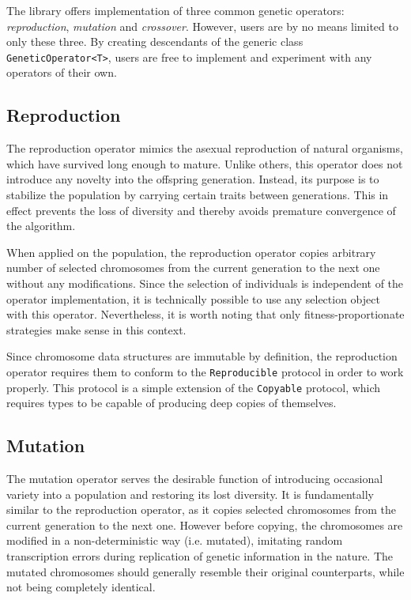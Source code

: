 The library offers implementation of three common genetic operators: \textit{reproduction}, \textit{mutation} and \textit{crossover}. However, users are by no means limited to only these three. By creating descendants of the generic class \texttt{GeneticOperator<T>}, users are free to implement and experiment with any operators of their own.

\subsection{Reproduction}\label{section:reproduction}
The reproduction operator mimics the asexual reproduction of natural organisms, which have survived long enough to mature. Unlike others, this operator does not introduce any novelty into the offspring generation. Instead, its purpose is to stabilize the population by carrying certain traits between generations. This in effect prevents the loss of diversity and thereby avoids premature convergence of the algorithm.

When applied on the population, the reproduction operator copies arbitrary number of selected chromosomes from the current generation to the next one without any modifications. Since the selection of individuals is independent of the operator implementation, it is technically possible to use any selection object with this operator. Nevertheless, it is worth noting that only fitness-proportionate strategies make sense in this context.

Since chromosome data structures are immutable by definition, the reproduction operator requires them to conform to the \texttt{Reproducible} protocol in order to work properly. This protocol is a simple extension of the \texttt{Copyable} protocol, which requires types to be capable of producing deep copies of themselves.

\subsection{Mutation}\label{section:mutation}
The mutation operator serves the desirable function of introducing occasional variety into a population and restoring its lost diversity. \cite{Koza1992} It is fundamentally similar to the reproduction operator, as it copies selected chromosomes from the current generation to the next one. However before copying, the chromosomes are modified in a non-deterministic way (i.e. mutated), imitating random transcription errors during replication of genetic information in the nature. The mutated chromosomes should generally resemble their original counterparts, while not being completely identical.

